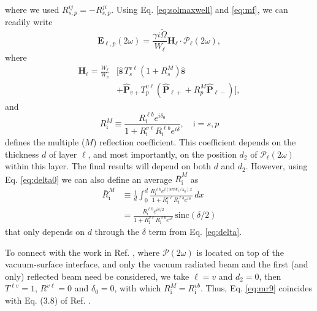 \documentclass[aps,prb,10pt,showpacs,letterpaper,twocolumn]{revtex4-1}
\begin{document}
where we used $R^{ij}_{s,p} = -R^{ji}_{s,p}$. Using Eq. \eqref{eq:solmaxwell}
and \eqref{eq:mf}, we can readily write
\begin{equation}\label{eq:mr8}
\mathbf{E}_{\ell,p}(2\omega) =
\frac{\gamma i\tilde{\Omega}}{W_{\ell}}\mathbf{H}_{\ell}\cdot
\boldsymbol{\mathcal{P}}_{\ell}(2\omega),
\end{equation}
where
\begin{equation}\label{eq:mr9}
\begin{split}
\mathbf{H}_{\ell}
= \frac{W_\ell}{W_v}
&\Big[
\hat{\mathbf{s}}\,T_{s}^{v\ell}
\left(1+ R^{M}_{s}\right)\hat{\mathbf{s}}\\
&+ \hat{\mathbf{P}}_{v+}T_{p}^{v\ell}
\left(\hat{\mathbf{P}}_{\ell +} + R^{M}_{p}\hat{\mathbf{P}}_{\ell -}\right)
\Big],
\end{split}
\end{equation}
and
\begin{equation}\label{m61}
R^{M}_{\mathrm{i}}\equiv
\frac{R^{\ell b}_{\mathrm{i}}e^{i\delta_{0}}}
     {1+R^{v\ell}_{\mathrm{i}} R^{\ell b}_{\mathrm{i}}e^{i\delta}},
     \quad \mathrm{i}=s,p
\end{equation}
defines the multiple ($M$) reflection coefficient. This coefficient depends on
the thickness $d$ of layer $\ell$, and most importantly, on the position $d_{2}$
of $\boldsymbol{\mathcal{P}}_{\ell}(2\omega)$ within this layer. The final
results will depend on both $d$ and $d_{2}$. However, using Eq.
\eqref{eq:delta0} we can also define an average $\bar{R}^{M}_{\mathrm{i}}$ as
\begin{equation}\label{eq:mcave}
\begin{split}
\bar{R}^{M}_{\mathrm{i}}&\equiv 
\frac{1}{d}\int_{0}^{d}
\frac{R^{\ell b}_{\mathrm{i}}e^{i(8\pi W_{\ell}/\lambda_{0})x}}
{1 + R^{v\ell}_{\mathrm{i}}R^{\ell b}_{\mathrm{i}}e^{i\delta}}\,dx\\
&= \frac{R^{\ell b}_{\mathrm{i}}e^{i\delta/2}}
{1 + R^{v\ell}_{\mathrm{i}}R^{\ell b}_{\mathrm{i}}e^{i\delta}}
\,\mathrm{sinc}(\delta/2)
\end{split}
\end{equation}
that only depends on $d$ through the $\delta$ term from Eq. \eqref{eq:delta}.

To connect with the work in Ref. , where
$\boldsymbol{\mathcal{P}}(2\omega)$ is located on top of the vacuum-surface
interface, and only the vacuum radiated beam and the first (and only) reflected
beam need be considered, we take $\ell = v$ and $d_{2} = 0$, then $T^{\ell v} =
1$, $R^{v\ell} = 0$ and $\delta_{0} = 0$, with which $R^{M}_{\mathrm{i}} =
R^{vb}_{\mathrm{i}}$. Thus, Eq. \eqref{eq:mr9} coincides with Eq. (3.8) of Ref.
.
\end{document}
